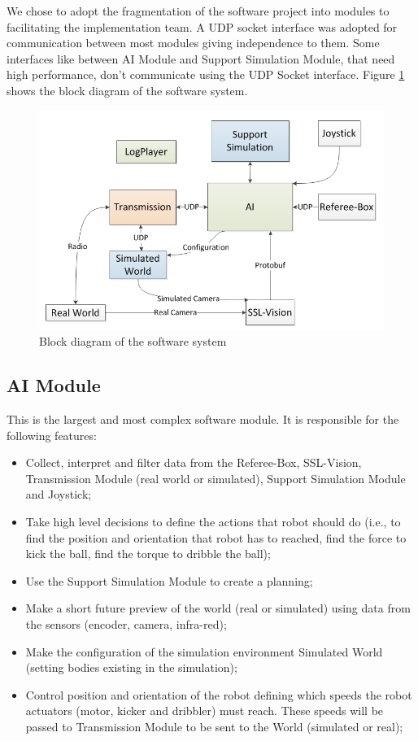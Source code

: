 \documentclass{llncs}
\begin{document}
	We chose to adopt the fragmentation of the software project into modules to facilitating the implementation team. A UDP socket interface was adopted for communication between most modules giving independence to them. Some interfaces like between AI Module and Support Simulation Module, that need high performance, don't communicate using the UDP Socket interface. Figure \ref{fluxogramaSoftware} shows the block diagram of the software system.

\begin{figure}[thpb]
     \centering
     \includegraphics[scale=0.55]{img/fluxogramaSoftware.png}
     \caption{Block diagram of the software system}
     \label{fluxogramaSoftware}
\end{figure}

\subsection{AI Module}
	This is the largest and most complex software module. It is responsible for the following features:
\begin{itemize}
\item Collect, interpret and filter data from the Referee-Box, SSL-Vision, Transmission Module (real world or simulated), Support Simulation Module and Joystick;
\item Take high level decisions to define the actions that robot should do (i.e., to find the position and orientation that robot has to reached, find the force to kick the ball, find the torque to dribble the ball);
\item Use the Support Simulation Module to create a planning;
\item Make a short future preview of the world (real or simulated) using data from the sensors (encoder, camera, infra-red);
\item Make the configuration of the simulation environment Simulated World (setting bodies existing in the simulation);
\item Control position and orientation of the robot defining which speeds the robot actuators (motor, kicker and dribbler) must reach. These speeds will be passed to Transmission Module to be sent to the World (simulated or real);
\end{itemize}
\end{document}
